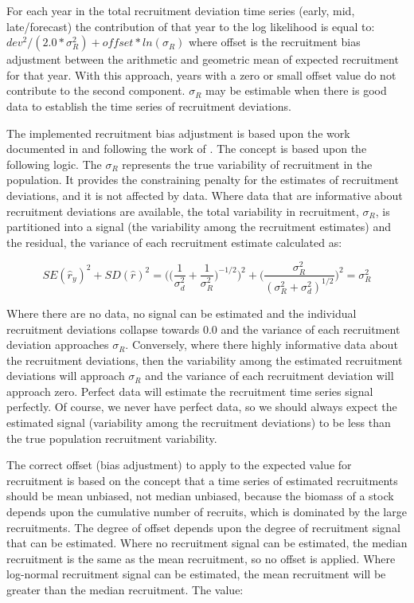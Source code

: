 \hypertarget{RecBias}{}
For each year in the total recruitment deviation time series (early, mid, late/forecast) the contribution of that year to the log likelihood is equal to: $dev^2/(2.0*\sigma^2_R)+offset*ln(\sigma_R)$ where offset is the recruitment bias adjustment between the arithmetic and geometric mean of expected recruitment for that year. With this approach, years with a zero or small offset value do not contribute to the second component. $\sigma_R$ may be estimable when there is good data to establish the time series of recruitment deviations.

The implemented recruitment bias adjustment is based upon the work documented in \citet{methot-adjusting-2011} and following the work of \citet{maunder-estimation-2003}. The concept is based upon the following logic. The $\sigma_R$ represents the true variability of recruitment in the population. It provides the constraining penalty for the estimates of recruitment deviations, and it is not affected by data. Where data that are informative about recruitment deviations are available, the total variability in recruitment, $\sigma_R$, is partitioned into a signal (the variability among the recruitment estimates) and the residual, the variance of each recruitment estimate calculated as:

\begin{equation}
SE(\hat{r}_y)^2 + SD(\hat{r})^2=\Bigg( \bigg( \frac{1}{\sigma^2_d}+\frac{1}{\sigma^2_R}\bigg)^{-1/2}\Bigg)^2+\Bigg( \frac{\sigma^2_R}{(\sigma^2_R+\sigma^2_d)^{1/2}}\Bigg)^2=\sigma^2_R
\end{equation}

Where there are no data, no signal can be estimated and the individual recruitment deviations collapse towards 0.0 and the variance of each recruitment deviation approaches $\sigma_R$. Conversely, where there highly informative data about the recruitment deviations, then the variability among the estimated recruitment deviations will approach $\sigma_R$ and the variance of each recruitment deviation will approach zero. Perfect data will estimate the recruitment time series signal perfectly. Of course, we never have perfect data, so we should always expect the estimated signal (variability among the recruitment deviations) to be less than the true population recruitment variability.


The correct offset (bias adjustment) to apply to the expected value for recruitment is based on the concept that a time series of estimated recruitments should be mean unbiased, not median unbiased, because the biomass of a stock depends upon the cumulative number of recruits, which is dominated by the large recruitments. The degree of offset depends upon the degree of recruitment signal that can be estimated. Where no recruitment signal can be estimated, the median recruitment is the same as the mean recruitment, so no offset is applied. Where log-normal recruitment signal can be estimated, the mean recruitment will be greater than the median recruitment. The value:

